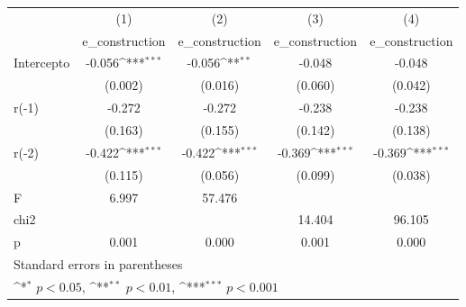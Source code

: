 {
\def\sym#1{\ifmmode^{#1}\else\(^{#1}\)\fi}
\begin{longtable}{l*{4}{c}}
\hline\hline\endfirsthead\hline\endhead\hline\endfoot\endlastfoot
            &\multicolumn{1}{c}{(1)}&\multicolumn{1}{c}{(2)}&\multicolumn{1}{c}{(3)}&\multicolumn{1}{c}{(4)}\\
            &\multicolumn{1}{c}{e\_construction}&\multicolumn{1}{c}{e\_construction}&\multicolumn{1}{c}{e\_construction}&\multicolumn{1}{c}{e\_construction}\\
\hline
Intercepto  &      -0.056\sym{***}&      -0.056\sym{**} &      -0.048         &      -0.048         \\
            &     (0.002)         &     (0.016)         &     (0.060)         &     (0.042)         \\
r(-1)       &      -0.272         &      -0.272         &      -0.238         &      -0.238         \\
            &     (0.163)         &     (0.155)         &     (0.142)         &     (0.138)         \\
r(-2)       &      -0.422\sym{***}&      -0.422\sym{***}&      -0.369\sym{***}&      -0.369\sym{***}\\
            &     (0.115)         &     (0.056)         &     (0.099)         &     (0.038)         \\
\hline
F           &       6.997         &      57.476         &                     &                     \\
chi2        &                     &                     &      14.404         &      96.105         \\
p           &       0.001         &       0.000         &       0.001         &       0.000         \\
\hline\hline
\multicolumn{5}{l}{\footnotesize Standard errors in parentheses}\\
\multicolumn{5}{l}{\footnotesize \sym{*} \(p<0.05\), \sym{**} \(p<0.01\), \sym{***} \(p<0.001\)}\\
\end{longtable}
}
